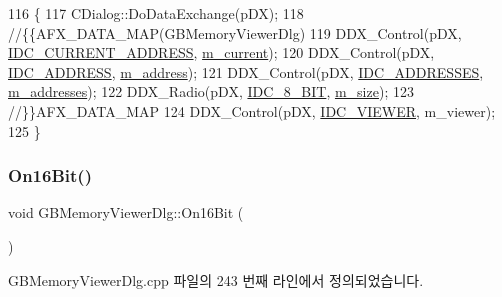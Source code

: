 \begin{DoxyCode}
116 \{
117   CDialog::DoDataExchange(pDX);
118   \textcolor{comment}{//\{\{AFX\_DATA\_MAP(GBMemoryViewerDlg)}
119   DDX\_Control(pDX, \mbox{\hyperlink{resource_8h_a276d745c58339acb548a3b1d2f2ce3fb}{IDC\_CURRENT\_ADDRESS}}, \mbox{\hyperlink{class_g_b_memory_viewer_dlg_a6348445a74339561b811824e2698d501}{m\_current}});
120   DDX\_Control(pDX, \mbox{\hyperlink{resource_8h_af0726d27cf7b7070867a81fde283a218}{IDC\_ADDRESS}}, \mbox{\hyperlink{class_g_b_memory_viewer_dlg_abf9f9d9537192c37806951dc8b1f96c0}{m\_address}});
121   DDX\_Control(pDX, \mbox{\hyperlink{resource_8h_a900caa910614ea7f4cf4c2fa5ef5ef2f}{IDC\_ADDRESSES}}, \mbox{\hyperlink{class_g_b_memory_viewer_dlg_af3cb69fc0a793bfb57e2abebbb300e4d}{m\_addresses}});
122   DDX\_Radio(pDX, \mbox{\hyperlink{resource_8h_a91648d6bfade78604103afe17af937bb}{IDC\_8\_BIT}}, \mbox{\hyperlink{class_g_b_memory_viewer_dlg_a9837ff346b59fb46c6b778a0adf8adf8}{m\_size}});
123   \textcolor{comment}{//\}\}AFX\_DATA\_MAP}
124   DDX\_Control(pDX, \mbox{\hyperlink{resource_8h_a183e37b5faddaacf9f89ffbaf9eac751}{IDC\_VIEWER}}, m\_viewer);
125 \}
\end{DoxyCode}
\mbox{\label{class_g_b_memory_viewer_dlg_a52b3f9fedab4314bd634becf88c756a2}} 
\subsubsection{\texorpdfstring{On16\+Bit()}{On16Bit()}}
{\footnotesize\ttfamily void G\+B\+Memory\+Viewer\+Dlg\+::\+On16\+Bit (\begin{DoxyParamCaption}{ }\end{DoxyParamCaption})\hspace{0.3cm}{\ttfamily [protected]}}



G\+B\+Memory\+Viewer\+Dlg.\+cpp 파일의 243 번째 라인에서 정의되었습니다.


